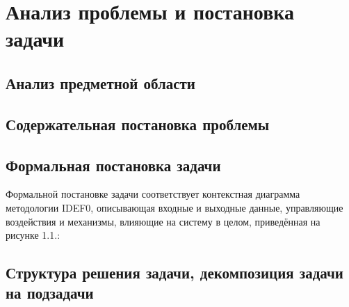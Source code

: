 \newpage
\section{Анализ проблемы и постановка задачи}



\subsection{Анализ предметной области}

\subsection{Содержательная постановка проблемы}

\subsection{Формальная постановка задачи}
Формальной постановке задачи соответствует контекстная диаграмма методологии IDEF0, описывающая входные и выходные данные, управляющие воздействия и механизмы,
влияющие на систему в целом, приведённая на рисунке 1.1.:

\subsection{Структура решения задачи, декомпозиция задачи на подзадачи}
